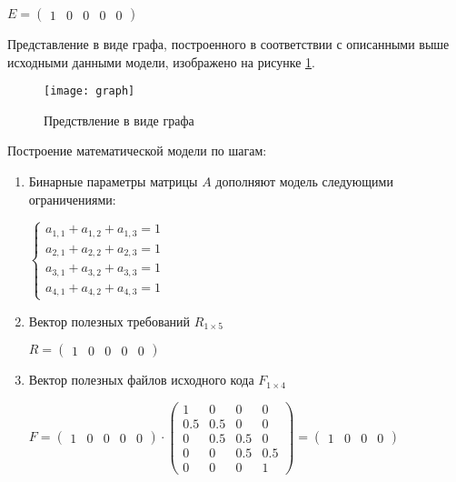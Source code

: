 \begin{center}
  $
  E = \begin{pmatrix}
    1 & 0 & 0 & 0 & 0
  \end{pmatrix}
  $
\end{center}

Представление в виде графа, построенного в соответствии с описанными выше исходными данными модели, изображено на рисунке \ref{fig:graph}.

\begin{figure}[H]
  \centering
  \texttt{[image: graph]}
  \caption{Предствление в виде графа}
  \label{fig:graph}
\end{figure}

Построение математической модели по шагам:
\begin{enumerate}
  \item Бинарные параметры матрицы $A$ дополняют модель следующими ограничениями:
  \begin{center}
    $
      \begin{cases}
        a_{1,1} + a_{1,2} + a_{1,3} = 1 \\ %
        a_{2,1} + a_{2,2} + a_{2,3} = 1 \\ %
        a_{3,1} + a_{3,2} + a_{3,3} = 1 \\ %
        a_{4,1} + a_{4,2} + a_{4,3} = 1 %
      \end{cases}
    $
  \end{center}
  \item Вектор полезных требований $R_{1 \times 5}$
  \begin{center}
    $
      R = 
      \begin{pmatrix}
        1 & 0 & 0 & 0 & 0
      \end{pmatrix}
    $
  \end{center}
  
  \item Вектор полезных файлов исходного кода $F_{1 \times 4}$
  \begin{center}
    $
      F = 
      \begin{pmatrix}
        1 & 0 & 0 & 0 & 0
      \end{pmatrix}
      \cdot
      \begin{pmatrix}
        1 &   0 &   0 & 0   \\
      0.5 & 0.5 &   0 & 0   \\
        0 & 0.5 & 0.5 & 0   \\
        0 &   0 & 0.5 & 0.5 \\
        0 &   0 &   0 & 1 
    \end{pmatrix}
    = \begin{pmatrix}
        1 & 0 & 0 & 0
      \end{pmatrix}
    $
  \end{center}
  

\end{enumerate}
